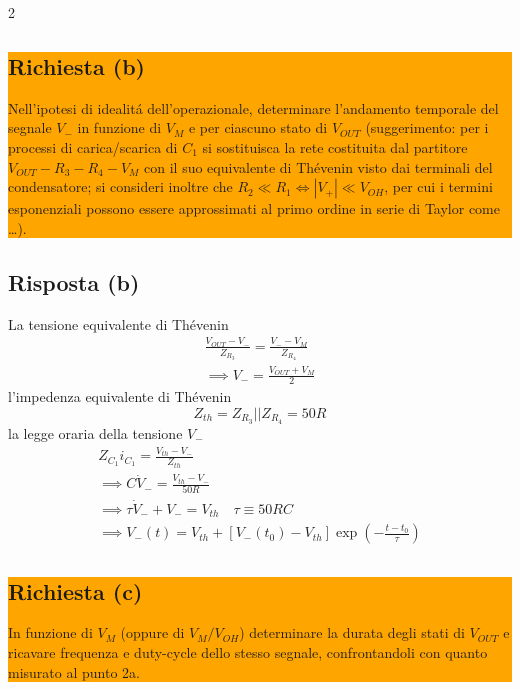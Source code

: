 \begin{multicols}{2}
  \noindent\colorbox{orange}{
    \begin{minipage}{0.9\linewidth}
      \subsection*{Richiesta (b)}
      Nell'ipotesi di idealit\'a dell'operazionale, determinare l'andamento temporale del segnale $V_-$
      in funzione di $V_M$ e per ciascuno stato di $V_{OUT}$ (suggerimento: per i processi di carica/scarica
      di $C_1$ si sostituisca la rete costituita dal partitore $V_{OUT}-R_3-R_4-V_M$ con il suo equivalente di
      Th\'evenin visto dai terminali del condensatore; si consideri inoltre che $R_2 \ll R_1 \iff |V_+|\ll V_{OH}$,
      per cui i termini esponenziali possono essere approssimati al primo ordine in serie di Taylor
      come …).
    \end{minipage}
  }
  \subsection*{Risposta (b)}
  La tensione equivalente di Th\'evenin
  \begin{equation*}
    \begin{gathered}
      \frac{V_{OUT} - V_-}{Z_{R_3}} = \frac{V_- - V_M}{Z_{R_4}} \\ \implies
      V_- = \frac{V_{OUT} + V_M}{2}
    \end{gathered}
  \end{equation*}
  l'impedenza equivalente di Th\'evenin
  \begin{equation*}
    Z_{th} = Z_{R_3} || Z_{R_4} = 50R
  \end{equation*}
  la legge oraria della tensione $V_-$
  \begin{equation*}
    \begin{gathered}
      Z_{C_1}i_{C_1} = \frac{V_{th} - V_-}{Z_{th}} \\ \implies
      C\dot{V}_- = \frac{V_{th} - V_-}{50 R} \\ \implies
      \tau\dot{V}_- + V_- = V_{th} \quad \tau \equiv 50RC \\ \implies
      V_-(t) = V_{th} + [V_-(t_0) - V_{th}]\exp\left(-\frac{t - t_0}{\tau}\right)
    \end{gathered}
  \end{equation*}

  \noindent\colorbox{orange}{
    \begin{minipage}{0.9\linewidth}
      \subsection*{Richiesta (c)}
      In funzione di $V_M$ (oppure di $V_M/V_{OH}$) determinare la durata degli stati di $V_{OUT}$ e ricavare
      frequenza e duty-cycle dello stesso segnale, confrontandoli con quanto misurato al punto 2a.
    \end{minipage}
  }

\end{multicols}
